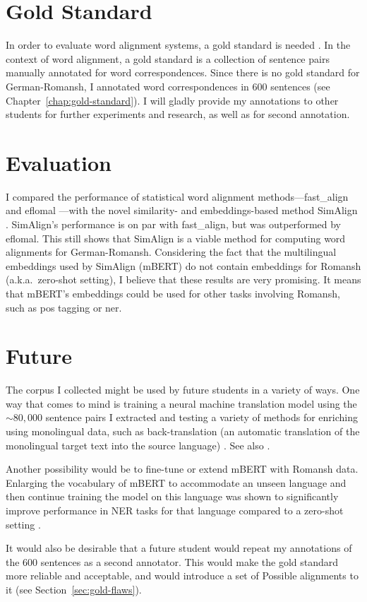 \section{Gold Standard}
In order to evaluate word alignment systems, a gold standard is needed \autocite[115]{koehn2009}. 
In the context of word alignment, a gold standard is a collection of sentence pairs manually annotated for word correspondences. 
Since there is no gold standard for German-Romansh, I annotated word correspondences in 600 sentences (see Chapter~\ref{chap:gold-standard}). I will  gladly provide my annotations to other students for further experiments and research, as well as for second annotation.  

\section{Evaluation}
I compared the performance of statistical word alignment methods---fast\_align \autocite{dyer-etal-2013-simple} and eflomal \autocite{Ostling2016efmaral}---with the novel similarity- and embeddings-based method SimAlign \autocite{jalili-sabet-etal-2020-simalign}. 
SimAlign's performance is on par with fast\_align, but was outperformed by eflomal. 
This still shows that SimAlign is a viable method for computing word alignments for German-Romansh. 
Considering the fact that the multilingual embeddings used by SimAlign (mBERT) do not contain embeddings for Romansh (a.k.a.~zero-shot setting), I believe that these results are very promising. 
It means that mBERT's embeddings could be used for other tasks involving Romansh, such as \acrfull{pos} tagging or \acrfull{ner}.

\section{Future}
The corpus I collected might be used by future students in a variety of ways. 
One way that comes to mind is training a neural machine translation model using the $\sim80,000$ sentence pairs I extracted and testing a variety of methods for enriching using monolingual data, such as back-translation (an automatic translation of the monolingual target text into the source language) \autocite{sennrich-etal-2016-improving}. 
See also \textcite{https://doi.org/10.48550/arxiv.2107.04239}.

Another possibility would be to fine-tune or extend mBERT with Romansh data. 
Enlarging the vocabulary of mBERT to accommodate an unseen language and then continue training the model on this language was shown to significantly improve performance in  NER tasks for that language compared to a zero-shot setting \autocite{wang-etal-2020-extending}. 

It would also be desirable that a future student would repeat my annotations of the 600 sentences as a second annotator. 
This would make the gold standard more reliable and acceptable, and would introduce a set of Possible alignments to it (see Section~\ref{sec:gold-flaws}).




